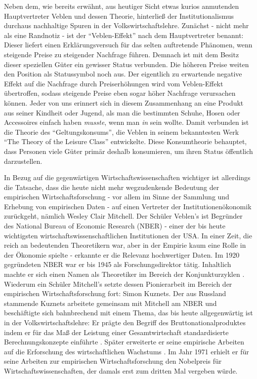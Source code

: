 Neben dem, wie bereits erwähnt, aus heutiger Sicht etwas kurios anmutenden Hauptvertreter Veblen und dessen Theorie, hinterließ der Institutionalismus durchaus nachhaltige Spuren in der Volkswirtschaftslehre. Zunächst - nicht mehr als eine Randnotiz - ist der "`Veblen-Effekt"' nach dem Hauptvertreter benannt: Dieser liefert einen Erklärungsversuch für das selten auftretende Phänomen, wenn steigende Preise zu steigender Nachfrage führen. Demnach ist mit dem Besitz dieser speziellen Güter ein gewisser Status verbunden. Die höheren Preise weiten den Position als Statussymbol noch aus. Der eigentlich zu erwartende negative Effekt auf die Nachfrage durch Preiserhöhungen wird vom Veblen-Effekt übertroffen, sodass steigende Preise eben sogar höher Nachfrage verursachen können. Jeder von uns erinnert sich in diesem Zusammenhang an eine Produkt aus seiner Kindheit oder Jugend, als man die bestimmten Schuhe, Hosen oder Accessoires einfach haben \textit{musste}, wenn man \textit{in} sein wollte. Damit verbunden ist die Theorie des "`Geltungskonsums"', die Veblen in seinem bekanntesten Werk "`The Theory of the Leisure Class"' \parencite{Veblen1899} entwickelte. Diese Konsumtheorie behauptet, dass Personen viele Güter primär deshalb konsumieren, um ihren Status öffentlich darzustellen.

In Bezug auf die gegenwärtigen Wirtschaftswissenschaften wichtiger ist allerdings die Tatsache, dass die heute nicht mehr wegzudenkende Bedeutung der empirischen Wirtschaftsforschung - vor allem im Sinne der Sammlung und Erhebung von empirischen Daten - auf einen Vertreter der Institutionenökonomik zurückgeht, nämlich Wesley Clair Mitchell. Der Schüler Veblen's ist Begründer des National Bureau of Economic Research (NBER) - einer der bis heute wichtigsten wirtschaftswissenschaftlichen Institutionen der USA. In einer Zeit, die reich an bedeutenden Theoretikern war, aber in der Empirie kaum eine Rolle in der Ökonomie spielte - erkannte er die Relevanz hochwertiger Daten. Im 1920 gegründeten NBER war er bis 1945 als Forschungsdirektor tätig. Inhaltlich machte er sich einen Namen als Theoretiker im Bereich der Konjunkturzyklen \parencite{Mitchell1913, Mitchell1946}. Wiederum ein Schüler Mitchell's setzte dessen Pionierarbeit im Bereich der empirischen Wirtschaftsforschung fort: Simon Kuznets. Der aus Russland stammende Kuznets arbeitete gemeinsam mit Mitchell am NBER und beschäftigte sich bahnbrechend mit einem Thema, das bis heute allgegenwärtig ist in der Volkswirtschaftslehre: Er prägte den Begriff des Bruttonationalproduktes \parencite{Kuznets1937} indem er für das Maß der Leistung einer Gesamtwirtschaft standardisierte Berechnungskonzepte einführte \parencite{Nobelpreis-Komitee1971}. Später erweiterte er seine empirische Arbeiten auf die Erforschung des wirtschaftlichen Wachstums \parencite{Kuznets1967}. Im Jahr 1971 erhielt er für seine Arbeiten zur empirischen Wirtschaftsforschung den Nobelpreis für Wirtschaftswissenschaften, der damals erst zum dritten Mal vergeben würde. 

